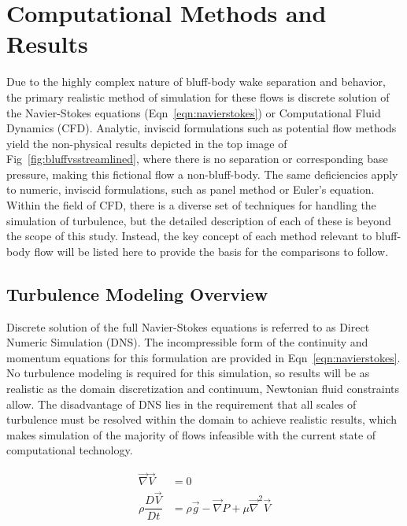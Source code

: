 \documentclass[journal]{new-aiaa}
\begin{document}
\section{Computational Methods and Results} \label{sec:computationalmethods}

Due to the highly complex nature of bluff-body wake separation and behavior, the primary realistic method of simulation for these flows is discrete solution of the Navier-Stokes equations (Eqn~\ref{eqn:navierstokes}) or Computational Fluid Dynamics (CFD). Analytic, inviscid formulations such as potential flow methods yield the non-physical results depicted in the top image of Fig~\ref{fig:bluffvsstreamlined}, where there is no separation or corresponding base pressure, making this fictional flow a non-bluff-body. The same deficiencies apply to numeric, inviscid formulations, such as panel method or Euler's equation. Within the field of CFD, there is a diverse set of techniques for handling the simulation of turbulence, but the detailed description of each of these is beyond the scope of this study. Instead, the key concept of each method relevant to bluff-body flow will be listed here to provide the basis for the comparisons to follow.


\subsection{Turbulence Modeling Overview} \label{subsec:turbulencemodeling}

 Discrete solution of the full Navier-Stokes equations is referred to as Direct Numeric Simulation (DNS). The incompressible form of the continuity and momentum equations for this formulation are provided in Eqn~\ref{eqn:navierstokes}. No turbulence modeling is required for this simulation, so results will be as realistic as the domain discretization and continuum, Newtonian fluid constraints allow. The disadvantage of DNS lies in the requirement that all scales of turbulence must be resolved within the domain to achieve realistic results, which makes simulation of the majority of flows infeasible with the current state of computational technology.

\begin{equation}
\label{eqn:navierstokes}
\begin{split}
\vec{\nabla}\vec{V} &= 0 \\
\rho \dfrac{D \vec{V}}{D t}
    &= \rho\vec{g} - \vec{\nabla} P + \mu \vec{\nabla}^2 \vec{V}
\end{split}
\end{equation}
\end{document}
